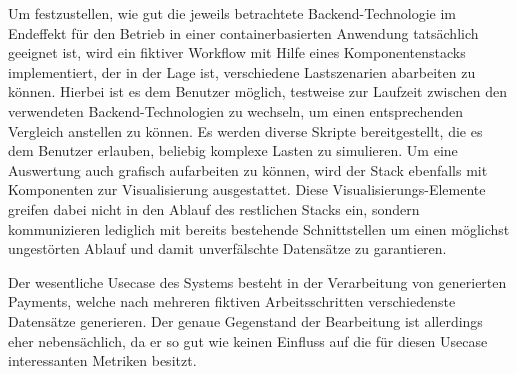 Um festzustellen, wie gut die jeweils betrachtete Backend-Technologie im Endeffekt für den Betrieb in einer containerbasierten Anwendung tatsächlich geeignet ist, wird ein fiktiver Workflow mit Hilfe eines Komponentenstacks implementiert, der in der Lage ist, verschiedene Lastszenarien abarbeiten zu können. Hierbei ist es dem Benutzer möglich, testweise zur Laufzeit zwischen den verwendeten Backend-Technologien zu wechseln, um einen entsprechenden Vergleich anstellen zu können. Es werden diverse Skripte bereitgestellt, die es dem Benutzer erlauben, beliebig komplexe Lasten zu simulieren. Um eine Auswertung auch grafisch aufarbeiten zu können, wird der Stack ebenfalls mit Komponenten zur Visualisierung ausgestattet. Diese Visualisierungs-Elemente greifen dabei nicht in den Ablauf des restlichen Stacks ein, sondern kommunizieren lediglich mit bereits bestehende Schnittstellen um einen möglichst ungestörten Ablauf und damit unverfälschte Datensätze zu garantieren. 

Der wesentliche Usecase des Systems besteht in der Verarbeitung von generierten Payments, welche nach mehreren fiktiven Arbeitsschritten verschiedenste Datensätze generieren. Der genaue Gegenstand der Bearbeitung ist allerdings eher nebensächlich, da er so gut wie keinen Einfluss auf die für diesen Usecase interessanten Metriken besitzt. 
